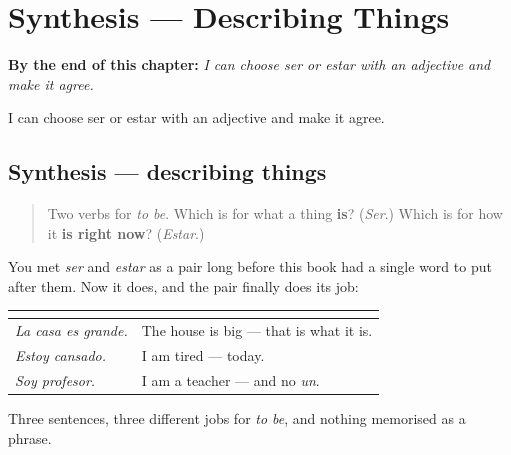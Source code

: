 
\chapter{Synthesis --- Describing Things}
\label{ch:sintesis-describir}

\begin{chapteropening}
\textbf{By the end of this chapter:} \emph{I can choose ser or estar with an adjective and make it agree.}

I can choose ser or estar with an adjective and make it agree.
\end{chapteropening}

\section[Practice]{Synthesis — describing things}

\label{lesson:ES-C09-sintesis-describir}



\begin{quote}
Two verbs for \emph{to be}. Which is for what a thing \textbf{is}? (\emph{Ser}.) Which is for how it \textbf{is right now}? (\emph{Estar}.)
\end{quote}

\begin{grammarlens}[title={What you've built}]
You met \emph{ser} and \emph{estar} as a pair long before this book had a single word to put after them. Now it does, and the pair finally does its job:

\noindent
\begin{tabularx}{\linewidth}{@{}>{\raggedright\arraybackslash}X>{\raggedright\arraybackslash}X@{}}
\toprule
\textbf{} & \textbf{} \\
\midrule
\emph{La casa es grande.} & The house is big — that is what it is. \\
\emph{Estoy cansado.} & I am tired — today. \\
\emph{Soy profesor.} & I am a teacher — and no \emph{un}. \\
\bottomrule
\end{tabularx}

Three sentences, three different jobs for \emph{to be}, and nothing memorised as a phrase.
\end{grammarlens}


